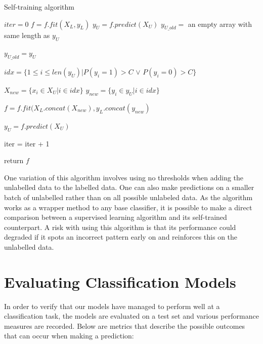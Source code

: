 \documentclass[../main.tex]{subfiles}
\begin{document}
\begin{algorithm} [H]
    \caption{Self-training algorithm \cite{zhu2007semi}}
    \label{algorithm:selfTrain}
    \begin{algorithmic}[H]
            \State $iter = 0$
            \State $f = f.fit(X_L, y_L)$
            \State $y_U = f.predict(X_U)$
            \State $y_{U\_old} =$ an empty array with same length as $y_U$
            
                \State $y_{U\_old} = y_{U}$
                
                \State $idx = \{1 \leq i \leq len(y_U) | P(y_i=1) > C$  $\vee$ $P(y_i=0) > C\}$
                
                \State $X_{new} = \{x_i \in X_U | i \in idx\}$  
                \State $y_{new} = \{y_i \in y_U | i \in idx\}$
                
                \State $f = f.fit(X_L.concat(X_{new}), y_L.concat(y_{new})$

                \State $y_U = f.predict(X_U)$

                \State iter = iter + 1

            \EndWhile
            \State return $f$
        \EndProcedure
    \end{algorithmic}
\end{algorithm}



One variation of this algorithm involves using no thresholds when adding the unlabelled data to the labelled data. One can also make predictions on a smaller batch of unlabelled rather than on all possible unlabeled data. As the algorithm works as a wrapper method to any base classifier, it is possible to make a direct comparison between a supervised learning algorithm and its self-trained counterpart. A risk with using this algorithm is that its performance could degraded if it spots an incorrect pattern early on and reinforces this on the unlabelled data. 

\section{Evaluating Classification Models}

In order to verify that our models have managed to perform well at a classification task, the models are evaluated on a test set and various performance measures are recorded. Below are metrics that describe the possible outcomes that can occur when making a prediction:
\end{document}
